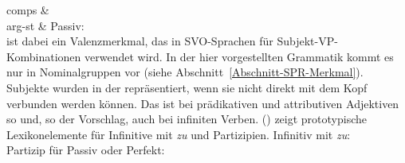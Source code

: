 {{         comps  & \\
         arg-st &  }
\ex Passiv:\\
\zl
\spr ist dabei ein Valenzmerkmal, das in SVO-Sprachen für Subjekt-VP-Kombinationen verwendet
wird. In der hier vorgestellten Grammatik kommt es nur in Nominalgruppen vor (siehe
Abschnitt~\ref{Abschnitt-SPR-Merkmal}). Subjekte wurden in der \subjl repräsentiert, wenn sie nicht
direkt mit dem Kopf verbunden werden können. Das ist \zb bei prädikativen und attributiven
Adjektiven so und, so der Vorschlag, auch bei infiniten Verben. () zeigt prototypische
Lexikonelemente für Infinitive mit \emph{zu} und Partizipien.
\eal
\label{ex-inf-pppARG-ST}
\ex 
\label{ex-inf-zu-mapping-ARGST}%
Infinitiv mit \emph{zu}:\\
\ex 
\label{ex-ppp-mapping-ARGST}%
Partizip für Passiv oder Perfekt:\\
\zl

}
